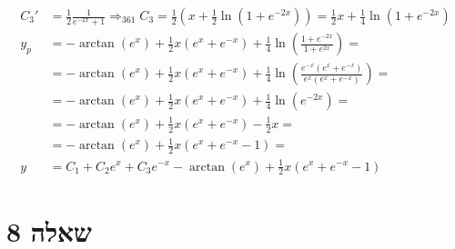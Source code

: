 \documentclass{article}
\begin{document}
\begin{align*}
    C_3'          & = \frac{1}{2} \frac{1}{e^{-2x}+1} \Rightarrow_{361} C_3 = \frac{1}{2}(x+\frac{1}{2}\ln(1+e^{-2x}))=\frac{1}{2}x+\frac{1}{4}\ln(1+e^{-2x})         \\
    y_p           & = -\arctan(e^x)+\frac{1}{2}x(e^x+e^{-x}) +\frac{1}{4}\ln(\frac{1+e^{-2x}}{1+e^{2x}}) =                                                            \\
                  & =-\arctan(e^x)+\frac{1}{2}x(e^x+e^{-x}) + \frac{1}{4}\ln(\frac{e^{-x}(e^x+e^{-x})}{e^x(e^x+e^{-x})}) =                                            \\
                  & =-\arctan(e^x)+\frac{1}{2}x(e^x+e^{-x}) + \frac{1}{4}\ln(e^{-2x}) =                                                                               \\
                  & =-\arctan(e^x)+\frac{1}{2}x(e^x+e^{-x}) - \frac{1}{2}x =                                                                                          \\
                  & =-\arctan(e^x)+\frac{1}{2}x(e^x+e^{-x}-1) =                                                                                                       \\
    y             & = C_1 + C_2e^x + C_3e^{-x}-\arctan(e^x)+\frac{1}{2}x(e^x+e^{-x}-1)
\end{align*}

\pagebreak

\section*{שאלה 8}
\end{document}
